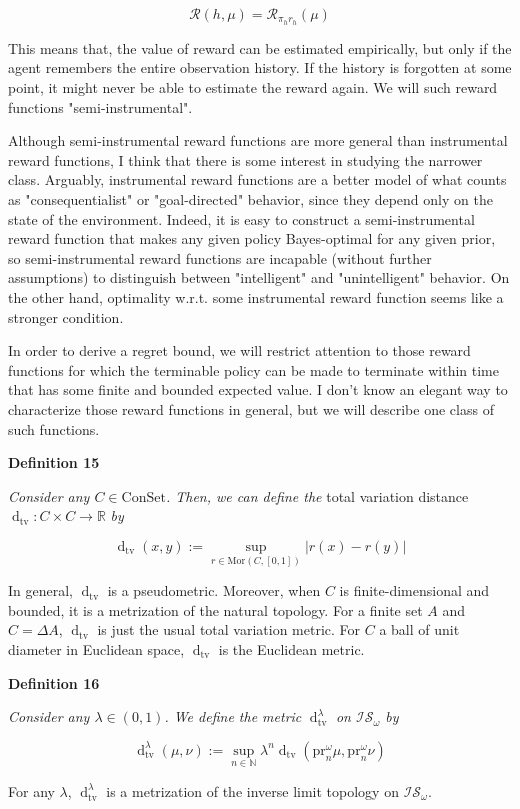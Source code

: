 \documentclass[a4paper]{article}
\newcommand{\Co}[1]{}
\newcommand{\AP}[1]{\left(#1\right)}
\newcommand{\Abs}[1]{\left\vert #1 \right\vert}
\newcommand{\Dtv}{\operatorname{d}_{\text{tv}}}
\newcommand{\Nats}{\mathbb{N}}
\newcommand{\Reals}{\mathbb{R}}
\newcommand{\Mor}{\mathrm{Mor}}
\newcommand{\R}{\mathcal{R}}
\newcommand{\Con}{{\boldsymbol{\mathrm{ConSet}}}}
\newcommand{\IS}{\mathcal{IS}}
\newcommand{\Prjo}{\mathrm{pr}^\omega_n}
\begin{document}
$$\R(h,\mu)=\R_{\pi_h r_h}(\mu)$$

This means that, the value of reward can be estimated empirically, but only if the agent remembers the entire observation history. If the history is forgotten at some point, it might never be able to estimate the reward again. We will such reward functions "semi-instrumental".

Although semi-instrumental reward functions are more general than instrumental reward functions, I think that there is some interest in studying the narrower class. Arguably, instrumental reward functions are a better model of what counts as "consequentialist" or "goal-directed" behavior, since they depend only on the state of the environment. Indeed, it is easy to construct a semi-instrumental reward function that makes any given policy Bayes-optimal for any given prior, so semi-instrumental reward functions are incapable (without further assumptions) to distinguish between "intelligent" and "unintelligent" behavior. On the other hand, optimality w.r.t. some instrumental reward function seems like a stronger condition.

In order to derive a regret bound, we will restrict attention to those reward functions for which the terminable policy can be made to terminate within time that has some finite and bounded expected value. I don't know an elegant way to characterize those reward functions in general, but we will describe one class of such functions.

\textbf{Definition 15}\Co{b}

\textit{Consider any $C\in\Con$. Then, we can define the} total variation distance $\Dtv:C\times C\rightarrow\Reals$ \textit{by}\Co{i}

$$\Dtv(x,y):=\sup_{r\in\Mor\AP{C,[0,1]}} \Abs{r(x)-r(y)}$$

In general, $\Dtv$ is a pseudometric. Moreover, when $C$ is finite-dimensional and bounded, it is a metrization of the natural topology. For a finite set $A$ and $C=\Delta A$, $\Dtv$ is just the usual total variation metric. For $C$ a ball of unit diameter in Euclidean space, $\Dtv$ is the Euclidean metric.

\textbf{Definition 16}\Co{b}

\textit{Consider any $\lambda\in(0,1)$. We define the metric} $\Dtv^\lambda$ \textit{on $\IS_\omega$ by}\Co{i}

$$\Dtv^\lambda(\mu,\nu):=\sup_{n\in\Nats}{\lambda^n\Dtv\AP{\Prjo\mu,\Prjo\nu}}$$

For any $\lambda$, $\Dtv^\lambda$ is a metrization of the inverse limit topology on $\IS_\omega$.
\end{document}

